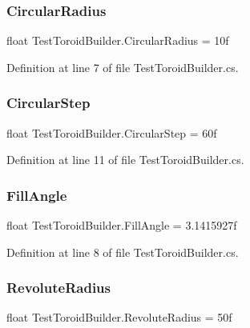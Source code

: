 \subsubsection{\texorpdfstring{CircularRadius}{CircularRadius}}
{\footnotesize\ttfamily float Test\+Toroid\+Builder.\+Circular\+Radius = 10f}



Definition at line 7 of file Test\+Toroid\+Builder.\+cs.

\mbox{\label{class_test_toroid_builder_af618b2645e5d67e11c0b3941ed20ca79}} 
\subsubsection{\texorpdfstring{CircularStep}{CircularStep}}
{\footnotesize\ttfamily float Test\+Toroid\+Builder.\+Circular\+Step = 60f}



Definition at line 11 of file Test\+Toroid\+Builder.\+cs.

\mbox{\label{class_test_toroid_builder_aec399be1f24a4fbfb2ccb6b5d773aad3}} 
\subsubsection{\texorpdfstring{FillAngle}{FillAngle}}
{\footnotesize\ttfamily float Test\+Toroid\+Builder.\+Fill\+Angle = 3.\+1415927f}



Definition at line 8 of file Test\+Toroid\+Builder.\+cs.

\mbox{\label{class_test_toroid_builder_a584e935292aef19738eaaa90ce4b1290}} 
\subsubsection{\texorpdfstring{RevoluteRadius}{RevoluteRadius}}
{\footnotesize\ttfamily float Test\+Toroid\+Builder.\+Revolute\+Radius = 50f}



